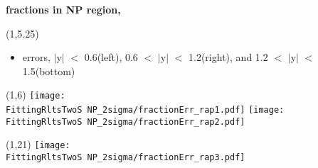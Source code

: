 \documentclass[11pt,slidescentered,red,compress,handout,hyperref={bookmarks=true},mathseriftable]{beamer}
\newcommand{\FittingRltsTwoS}{../Psi2S/Fit/parameter/evaluateCtau/}
\begin{document}
\begin{frame}[t]{\small \bf fractions in NP region,  }{}
\begin{textblock}{48}(1,5.25)
\begin{itemize}
\scriptsize \item errors, $|$y$|$ $<$ 0.6(left), 0.6 $<$ $|$y$|$ $<$ 1.2(right), and 1.2 $<$ $|$y$|$ $<$ 1.5(bottom)
\end{itemize}
\end{textblock}
\begin{textblock}{48}(1,6)
\hspace*{10pt} \texttt{[image: \\FittingRltsTwoS NP\_2sigma/fractionErr\_rap1.pdf]}
\hspace*{10pt} \texttt{[image: \\FittingRltsTwoS NP\_2sigma/fractionErr\_rap2.pdf]}
\begin{textblock}{48}(1,21)
\hspace*{10pt} \texttt{[image: \\FittingRltsTwoS NP\_2sigma/fractionErr\_rap3.pdf]}
\end{textblock}
\end{textblock}
\end{frame}
\end{document}
